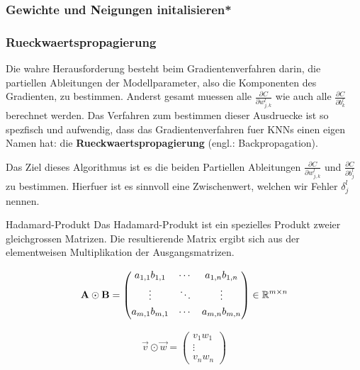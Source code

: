 \documentclass[../main]{subfiles}
\begin{document}
\subsubsection{Gewichte und Neigungen initalisieren*}

\subsubsection{Rueckwaertspropagierung}\label{sec:backpropagation}
Die wahre Herausforderung besteht beim Gradientenverfahren darin,
die partiellen Ableitungen der Modellparameter,
also die Komponenten des Gradienten, zu bestimmen.
Anderst gesamt muessen alle
$\frac{\partial C}{\partial w_{j,k}^l}$ wie auch alle $\frac{\partial
  C}{\partial b_k^l}$
berechnet werden. 
Das Verfahren zum bestimmen dieser Ausdruecke ist so spezfisch und aufwendig,
dass das Gradientenverfahren fuer KNNs einen eigen Namen hat: die
\textbf{Rueckwaertspropagierung} (engl.: Backpropagation).

Das Ziel dieses Algorithmus ist es die beiden Partiellen Ableitungen
$\frac{\partial C}{\partial w_{j,k}^l}$ und $\frac{\partial C}{\partial b_j^l}$
zu bestimmen. Hierfuer ist es sinnvoll eine Zwischenwert, welchen wir Fehler
$\delta_j^l$ nennen.

\par\medskip
\begin{defbox}{Hadamard-Produkt}
  Das Hadamard-Produkt ist ein spezielles Produkt zweier gleichgrossen Matrizen.
  Die resultierende Matrix ergibt sich aus der elementweisen Multiplikation der Ausgangsmatrizen.

  \begin{minipage}{0.5\textwidth}
    \begin{equation*}
      \mathbf{A} \odot \mathbf{B} =
      \begin{pmatrix}
        a_{1,1} b_{1,1} & \cdots & a_{1,n} b_{1,n} \\[0.3em]
        \vdots & \ddots & \vdots \\[0.3em]
        a_{m,1} b_{m,1} & \cdots & a_{m,n} b_{m,n} \\[0.3em]
      \end{pmatrix}
      \in \mathbb{R}^{m \times n}
    \end{equation*}
  \end{minipage}
  \begin{minipage}{0.5\textwidth}
    \begin{equation*}
      \vec{v} \odot \vec{w} =
      \begin{pmatrix}
        v_1 w_1 \\
        \vdots \\
        v_n w_n
      \end{pmatrix}
    \end{equation*}

  \end{minipage}
\end{defbox}
\par\medskip
\end{document}
